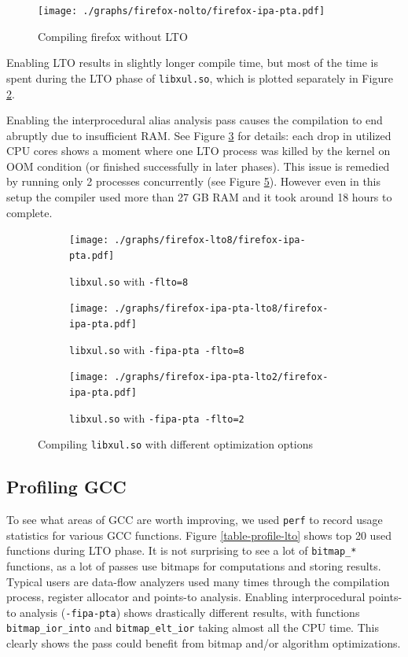 \begin{figure}[h!]
	\centering
	\texttt{[image: ./graphs/firefox-nolto/firefox-ipa-pta.pdf]}
	\caption{Compiling firefox without LTO}
	\label{figure-firefox-nolto}
\end{figure}

Enabling LTO results in slightly longer compile time, but most of the time is
spent during the LTO phase of {\tt libxul.so}, which is plotted separately in Figure
\ref{figure-firefox-lto8}.

Enabling the interprocedural alias analysis pass causes the compilation to end
abruptly due to insufficient RAM.  See Figure \ref{figure-firefox-ipa-pta-lto8}
for details: each drop in utilized CPU cores shows a moment where one LTO
process was killed by the kernel on OOM condition (or finished successfully in
later phases). This issue is remedied by running only 2 processes concurrently
(see Figure \ref{figure-firefox-ipa-pta-lto2}).  However even in this setup the
compiler used more than 27 GB RAM and it took around 18 hours to complete.

\begin{figure}
\begin{subfigure}[b]{\textwidth}
	\centering
	\texttt{[image: ./graphs/firefox-lto8/firefox-ipa-pta.pdf]}
	\caption{{\tt libxul.so} with {\tt -flto=8}}
	\label{figure-firefox-lto8}
\end{subfigure}
\begin{subfigure}[b]{\textwidth}
	\centering
	\texttt{[image: ./graphs/firefox-ipa-pta-lto8/firefox-ipa-pta.pdf]}
	\caption{{\tt libxul.so} with {\tt -fipa-pta -flto=8}}
	\label{figure-firefox-ipa-pta-lto8}
\end{subfigure}
\begin{subfigure}[b]{\textwidth}
	\centering
	\texttt{[image: ./graphs/firefox-ipa-pta-lto2/firefox-ipa-pta.pdf]}
	\caption{{\tt libxul.so} with {\tt -fipa-pta -flto=2}}
	\label{figure-firefox-ipa-pta-lto2}
\end{subfigure}
\caption{Compiling {\tt libxul.so} with different optimization options}
\end{figure}

\subsection{Profiling GCC}

To see what areas of GCC are worth improving, we used {\tt perf}  to record usage
statistics for various GCC functions. Figure \ref{table-profile-lto} shows top 20 used
functions during LTO phase. It is not surprising to see a lot of {\tt bitmap\_*}
functions, as a lot of passes use bitmaps for computations and storing results.
Typical users are data-flow analyzers \cite{muchnick1997advanced} used many times through the
compilation process, register allocator and points-to analysis. Enabling
interprocedural points-to analysis ({\tt -fipa-pta}) shows drastically different
results, with functions {\tt bitmap\_ior\_into} and {\tt bitmap\_elt\_ior}
taking almost all the CPU time. This clearly shows the pass could benefit from
bitmap and/or algorithm optimizations.

